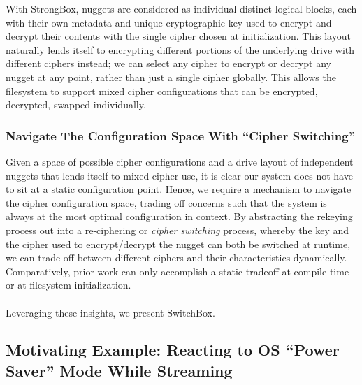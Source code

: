 With StrongBox, nuggets are considered as individual distinct logical blocks,
each with their own metadata and unique cryptographic key used to encrypt and
decrypt their contents with the single cipher chosen at initialization. This
layout naturally lends itself to encrypting different portions of the underlying
drive with different ciphers instead; we can select any cipher to encrypt or
decrypt any nugget at any point, rather than just a single cipher globally. This
allows the filesystem to support mixed cipher configurations that can be
encrypted, decrypted, swapped individually.

\subsubsection{Navigate The Configuration Space With ``Cipher Switching''}

Given a space of possible cipher configurations and a drive layout of
independent nuggets that lends itself to mixed cipher use, it is clear our
system does not have to sit at a static configuration point. Hence, we require a
mechanism to navigate the cipher configuration space, trading off concerns such
that the system is always at the most optimal configuration in context. By
abstracting the rekeying process out into a re-ciphering or \emph{cipher
switching} process, whereby the key and the cipher used to encrypt/decrypt the
nugget can both be switched at runtime, we can trade off between different
ciphers and their characteristics dynamically. Comparatively, prior work can
only accomplish a static tradeoff at compile time or at filesystem
initialization.
\\
\\
Leveraging these insights, we present SwitchBox. 

\subsection{Motivating Example: Reacting to OS ``Power Saver'' Mode While Streaming}

